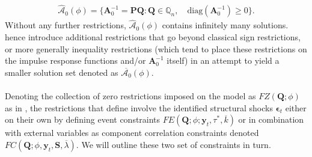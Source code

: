 \documentclass[a4paper,11pt,listof=nochaptergap,oneside,pointednumbers,bibtotoc,bigheadings,liststotoc]{scrbook}
\theoremstyle{mysatz}
\theoremstyle{mydefinition}
\theoremstyle{mybemerkung}
\let\oldhat\hat
\newcommand{\vect}[1]{\boldsymbol{\mathbf{#1}}}
\newcommand{\hatt}[1]{\oldhat{\boldsymbol{\mathbf{#1}}}}
\begin{document}
\begin{itemize}
\begin{equation}
\begin{split}
 			\hatt{\mathcal{A}}_0(\phi) = \{\vect{A}_0^{-1} = \vect{P}\vect{Q}: \vect{Q} \in \mathbb{Q}_n, \quad \text{diag}(\vect{A}_0^{-1}) \geq 0\}.
\end{split}								
\end{equation}
Without any further restrictions, $\hatt{\mathcal{A}}_0(\phi)$ contains infinitely many solutions. \citet{ludvigsonetal:18} hence introduce additional restrictions that go beyond classical sign restrictions, or more generally inequality restrictions (which tend to place these restrictions on the impulse response functions and/or $\vect{A}_0^{-1}$ itself) in an attempt to yield a smaller solution set denoted as $\overline{\mathcal{A}_0}(\phi)$.\\
\\
Denoting the collection of zero restrictions imposed on the model as $FZ(\vect{Q}; \phi)$ as in \citet{rubioetal:10}, the restrictions that \citet{ludvigsonetal:18} define involve the identified structural shocks $\vect{\epsilon}_t$ either on their own by defining event constraints $FE(\vect{Q}; \phi; \vect{y}_t, \tau^*, \overline{k})$ or in combination with external variables as component correlation constraints denoted $FC(\vect{Q}; \phi, \vect{y}_t, \vect{S}, \overline{\lambda})$. We will outline these two set of constraints in turn.


\end{itemize}
\end{document}
